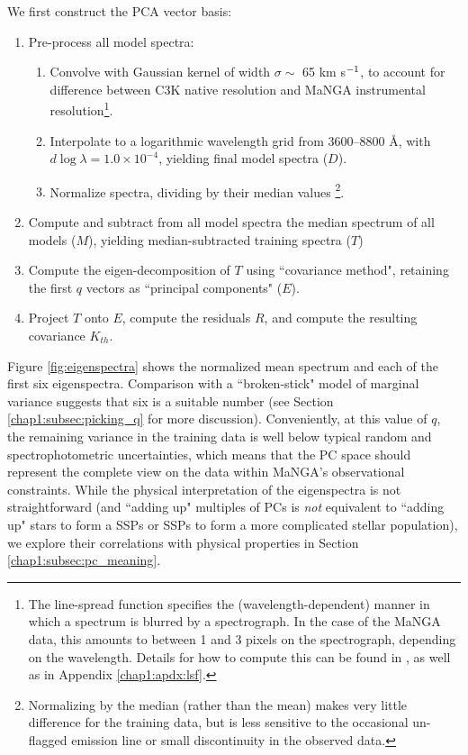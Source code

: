 We first construct the PCA vector basis:
\begin{enumerate}
\itemsep0em
    \item Pre-process all model spectra: 
    \begin{enumerate}
        \item Convolve with Gaussian kernel of width $\sigma \sim$ 65 km s$^{\rm -1}$, to account for difference between C3K native resolution and MaNGA instrumental resolution\footnote{The line-spread function specifies the (wavelength-dependent) manner in which a spectrum is blurred by a spectrograph. In the case of the MaNGA data, this amounts to between 1 and 3 pixels on the spectrograph, depending on the wavelength. Details for how to compute this can be found in \citet{cappellari_17}, as well as in Appendix \ref{chap1:apdx:lsf}.}.
        \item Interpolate to a logarithmic wavelength grid from 3600--8800 $\mbox{\AA}$, with $d \log \lambda = 1.0 \times 10^{-4}$, yielding final model spectra ($D$).
        \item Normalize spectra, dividing by their median values \footnote{Normalizing by the median (rather than the mean) makes very little difference for the training data, but is less sensitive to the occasional un-flagged emission line or small discontinuity in the observed data.}.
    \end{enumerate}
    \item Compute and subtract from all model spectra the median spectrum of all models ($M$), yielding median-subtracted training spectra ($T$)
    \item Compute the eigen-decomposition of $T$ using ``covariance method", retaining the first $q$ vectors as ``principal components" ($E$).
    \item Project $T$ onto $E$, compute the residuals $R$, and compute the resulting covariance $K_{th}$.
\end{enumerate}

Figure \ref{fig:eigenspectra} shows the normalized mean spectrum and each of the first six eigenspectra. Comparison with a ``broken-stick" model of marginal variance suggests that six is a suitable number (see Section \ref{chap1:subsec:picking_q} for more discussion). Conveniently, at this value of $q$, the remaining variance in the training data is well below typical random and spectrophotometric uncertainties, which means that the PC space should represent the complete view on the data within MaNGA's observational constraints. While the physical interpretation of the eigenspectra is not straightforward (and ``adding up" multiples of PCs is \emph{not} equivalent to ``adding up" stars to form a SSPs or SSPs to form a more complicated stellar population), we explore their correlations with physical properties in Section \ref{chap1:subsec:pc_meaning}.

